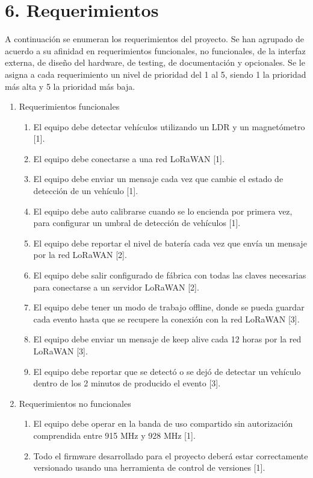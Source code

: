 \documentclass[
11pt, %
]{charter}
\begin{document}
\section{6. Requerimientos}
\label{sec:requerimientos}

A continuación se enumeran los requerimientos del proyecto. Se han agrupado de acuerdo a su afinidad en requerimientos funcionales, no funcionales, de la interfaz externa, de diseño del hardware, de testing, de documentación y opcionales. Se le asigna a cada requerimiento un nivel de prioridad del 1 al 5, siendo 1 la prioridad más alta y 5 la prioridad más baja.

\begin{enumerate}
	\item Requerimientos funcionales
		\begin{enumerate}
			\item El equipo debe detectar vehículos utilizando un LDR y un magnetómetro [1].
			\item El equipo debe conectarse a una red LoRaWAN [1].
			\item El equipo debe enviar un mensaje cada vez que cambie el estado de detección de un vehículo [1].
			\item El equipo debe auto calibrarse cuando se lo encienda por primera vez, para configurar un umbral de detección de vehículos [1].
			\item El equipo debe reportar el nivel de batería cada vez que envía un mensaje por la red LoRaWAN [2].
			\item El equipo debe salir configurado de fábrica con todas las claves necesarias para conectarse a un servidor LoRaWAN [2].
			\item El equipo debe tener un modo de trabajo offline, donde se pueda guardar cada evento hasta que se recupere la conexión con la red LoRaWAN [3].
			\item El equipo debe enviar un mensaje de keep alive cada 12 horas por la red LoRaWAN [3].
			\item El equipo debe reportar que se detectó o se dejó de detectar un vehículo dentro de los 2 minutos de producido el evento [3].
		\end{enumerate}
	\item Requerimientos no funcionales
		\begin{enumerate}
			\item El equipo debe operar en la banda de uso compartido sin autorización comprendida entre 915 MHz y 928 MHz [1].
			\item Todo el firmware desarrollado para el proyecto deberá estar correctamente versionado  usando una herramienta de control de versiones [1].

\end{enumerate}
\end{enumerate}
\end{document}
